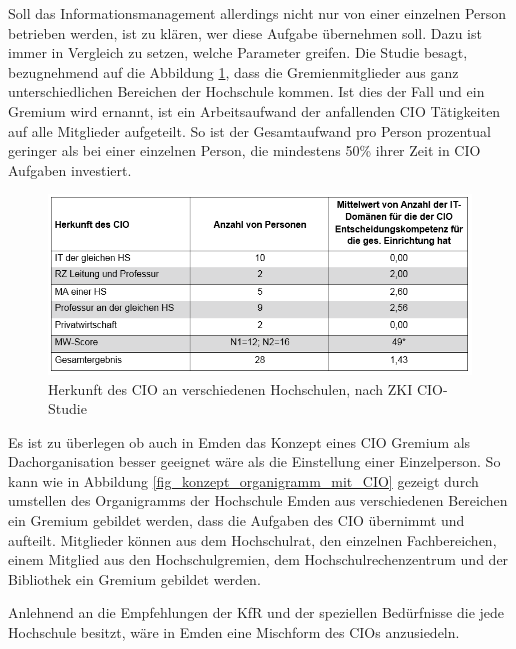 Soll das Informationsmanagement allerdings nicht nur von einer einzelnen Person betrieben werden, 
ist zu klären, wer diese Aufgabe übernehmen soll. Dazu ist immer in Vergleich zu setzen, welche 
Parameter greifen. Die Studie besagt, bezugnehmend auf die Abbildung \ref{fig_herkunft_cio_hochschulen}, 
dass die Gremienmitglieder aus ganz unterschiedlichen Bereichen der Hochschule kommen. Ist dies 
der Fall und ein Gremium wird ernannt, ist ein Arbeitsaufwand der anfallenden CIO Tätigkeiten 
auf alle Mitglieder aufgeteilt. So ist der Gesamtaufwand pro Person prozentual geringer als 
bei einer einzelnen Person, die mindestens 50\% ihrer Zeit in CIO Aufgaben investiert.

\begin{figure}
	\centering
	\includegraphics[width=\textwidth]
	{kapitel/gruppe3/bilder/herkunft_cio_hochschulen}
	\caption{Herkunft des CIO an verschiedenen Hochschulen, nach ZKI CIO-Studie}
	\label{fig_herkunft_cio_hochschulen}
\end{figure}

Es ist zu überlegen ob auch in Emden das Konzept eines CIO Gremium als Dachorganisation besser geeignet 
wäre als die Einstellung einer Einzelperson. So kann wie in Abbildung \ref{fig_konzept_organigramm_mit_CIO} 
gezeigt durch umstellen des Organigramms der Hochschule Emden aus verschiedenen Bereichen ein 
Gremium gebildet werden, dass die Aufgaben des CIO übernimmt und aufteilt. Mitglieder können aus 
dem Hochschulrat, den einzelnen Fachbereichen, einem Mitglied aus den Hochschulgremien, 
dem Hochschulrechenzentrum und der Bibliothek ein Gremium gebildet werden.

Anlehnend an die Empfehlungen der KfR und der speziellen Bedürfnisse die jede Hochschule besitzt, 
wäre in Emden eine Mischform des CIOs anzusiedeln.

